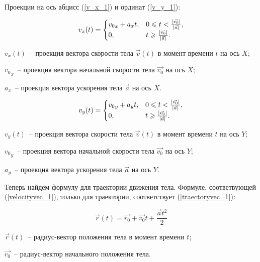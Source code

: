 Проекции на ось абцисс (\ref{v_x_1}) и ординат (\ref{v_y_1}):

\begin{equation}\label{v_x_1}
  v_x(t) =
  \begin{cases}
    {v_0}_x + a_x t, & 0 \leqslant t < \frac{\left|\vec{v_0}\right|}{\left|\vec{a}\right|}, \\
    0,               & t \geqslant \frac{\left|\vec{v_0}\right|}{\left|\vec{a}\right|}.
  \end{cases}
\end{equation}

\begin{Underequation}
  \(v_x(t)\)~-- проекция вектора скорости тела \(\vec{v}(t)\) в момент времени \(t\) на ось \(X\); 

  \({v_0}_x\)~-- проекция вектора начальной скорости тела \(\vec{v_0}\) на ось \(X\); 

  \(a_x\)~-- проекция вектора ускорения тела \(\vec{a}\) на ось \(X\). 
\end{Underequation}

\begin{equation}\label{v_y_1}
  v_y(t) =
  \begin{cases}
    {v_0}_y + a_y t, & 0  \leqslant t < \frac{\left|\vec{v_0}\right|}{\left|\vec{a}\right|}, \\
    0,               & t \geqslant \frac{\left|\vec{v_0}\right|}{\left|\vec{a}\right|}.
  \end{cases}
\end{equation}

\begin{Underequation}
  \(v_y(t)\)~-- проекция вектора скорости тела \(\vec{v}(t)\) в момент времени \(t\) на ось \(Y\); 

  \({v_0}_y\)~-- проекция вектора начальной скорости тела \(\vec{v_0}\) на ось \(Y\); 

  \(a_y\)~-- проекция вектора ускорения тела \(\vec{a}\) на ось \(Y\). 
\end{Underequation}

Теперь найдём формулу для траектории движения тела. Формуле, соответвующей (\ref{velocityvec_1}),
только для траектории, соответствует (\ref{traectoryvec_1}):

\begin{equation}\label{traectoryvec_1}
  \vec{r}(t) = \vec{r_0} + \vec{v_0}t + \frac{\vec{a}t^2}{2}
\end{equation}

\begin{Underequation}
  \(\vec{r}(t)\)~-- радиус-вектор положения тела в момент времени \(t\); 

  \(\vec{r_0}\)~-- радиус-вектор начального положения тела.
\end{Underequation}

